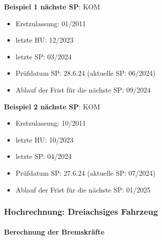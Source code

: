 \documentclass{vorlage-design-main}
\begin{document}
\textbf{Beispiel 1 nächste SP}: KOM

\begin{itemize}

\item
  Erstzulassung: 01/2011
\item
  letzte HU: 12/2023
\item
  letzte SP: 03/2024
\item
  Prüfdatum SP: 28.6.24 (aktuelle SP: 06/2024)
\item
  Ablauf der Frist für die nächste SP: 09/2024
\end{itemize}

\textbf{Beispiel 2 nächste SP}: KOM

\begin{itemize}

\item
  Erstzulassung: 10/2011
\item
  letzte HU: 10/2023
\item
  letzte SP: 04/2024
\item
  Prüfdatum SP: 27.6.24 (aktuelle SP: 07/2024)
\item
  Ablauf der Frist für die nächste SP: 01/2025
\end{itemize}

\newpage

\subsubsection{Hochrechnung: Dreiachsiges
Fahrzeug}\label{hochrechnung-dreiachsiges-fahrzeug}

\paragraph{Berechnung der
Bremskräfte}\label{berechnung-der-bremskraefte}
\end{document}
